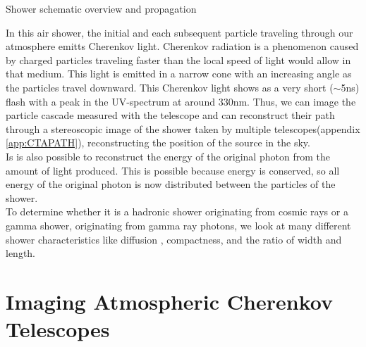 \documentclass[12pt,article,type=msc,colorback,accentcolor=tud9c]{tudthesis}
\begin{document}
Shower schematic overview and propagation


In this air shower, the initial and each subsequent particle traveling through our atmosphere emitts Cherenkov light. Cherenkov radiation is a phenomenon caused by charged particles traveling faster than the local speed of light would allow in that medium. This light is emitted in a narrow cone with an increasing angle as the particles travel downward. This Cherenkov light shows as a very short ($\sim$5ns) flash with a peak in the UV-spectrum at around 330nm.
Thus, we can image the particle cascade measured with the telescope and can reconstruct their path through a stereoscopic image of the shower taken by multiple telescopes(appendix {\ref{app:CTAPATH}}), reconstructing the position of the source in the sky.\\

Is is also possible to reconstruct the energy of the original photon from the amount of light produced. This is possible because energy is conserved, so all energy of the original photon is now distributed between the particles of the shower.\\

To determine whether it is a hadronic shower originating from cosmic rays or a gamma shower, originating from gamma ray photons, we look at many different shower characteristics like diffusion , compactness, and the ratio of width and length.




\clearpage
\section{\Large Imaging Atmospheric Cherenkov Telescopes}




\end{document}
